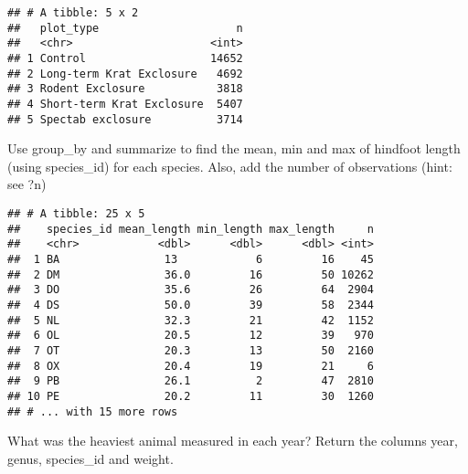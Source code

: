 \documentclass[]{article}
\newenvironment{Shaded}{\begin{snugshade}}{\end{snugshade}}
\newcommand{\KeywordTok}[1]{\textcolor[rgb]{0.13,0.29,0.53}{\textbf{#1}}}
\newcommand{\DataTypeTok}[1]{\textcolor[rgb]{0.13,0.29,0.53}{#1}}
\newcommand{\StringTok}[1]{\textcolor[rgb]{0.31,0.60,0.02}{#1}}
\newcommand{\OtherTok}[1]{\textcolor[rgb]{0.56,0.35,0.01}{#1}}
\newcommand{\OperatorTok}[1]{\textcolor[rgb]{0.81,0.36,0.00}{\textbf{#1}}}
\newcommand{\NormalTok}[1]{#1}
\begin{document}
\begin{verbatim}
## # A tibble: 5 x 2
##   plot_type                     n
##   <chr>                     <int>
## 1 Control                   14652
## 2 Long-term Krat Exclosure   4692
## 3 Rodent Exclosure           3818
## 4 Short-term Krat Exclosure  5407
## 5 Spectab exclosure          3714
\end{verbatim}

Use group\_by and summarize to find the mean, min and max of hindfoot
length (using species\_id) for each species. Also, add the number of
observations (hint: see ?n)

\begin{Shaded}
\end{Shaded}

\begin{verbatim}
## # A tibble: 25 x 5
##    species_id mean_length min_length max_length     n
##    <chr>            <dbl>      <dbl>      <dbl> <int>
##  1 BA                13            6         16    45
##  2 DM                36.0         16         50 10262
##  3 DO                35.6         26         64  2904
##  4 DS                50.0         39         58  2344
##  5 NL                32.3         21         42  1152
##  6 OL                20.5         12         39   970
##  7 OT                20.3         13         50  2160
##  8 OX                20.4         19         21     6
##  9 PB                26.1          2         47  2810
## 10 PE                20.2         11         30  1260
## # ... with 15 more rows
\end{verbatim}

What was the heaviest animal measured in each year? Return the columns
year, genus, species\_id and weight.

\begin{Shaded}
\end{Shaded}
\end{document}
